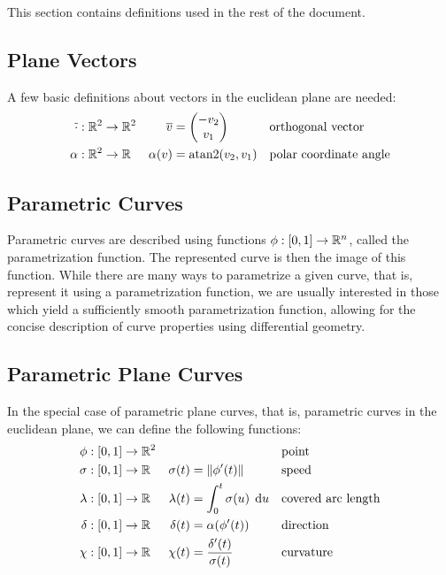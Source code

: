 \documentclass[a4paper]{article}
\begin{document}
		This section contains definitions used in the rest of the document.

		\subsection{Plane Vectors}
		\label{section:plane_vectors}

			A few basic definitions about vectors in the euclidean plane are needed:
			\begin{align*}
				\overline{\cdot} & : \function{\R{2}}{\R{2}} & \overline{v}      & = \vectorB{-v_2}{v_1}      && \text{orthogonal vector}\\
				\alpha           & : \function{\R{2}}{\RR}   & \apply{\alpha}{v} & = \apply{\atan2}{v_2, v_1} && \text{polar coordinate angle}
			\end{align*}

		\subsection{Parametric Curves}
		\label{section:parametric_curves}

			Parametric curves are described using functions \(\phi : \left[ 0,1 \right] \rightarrow \mathbb{R}^{n}\), called the parametrization function. The represented curve is then the image of this function. While there are many ways to parametrize a given curve, that is, represent it using a parametrization function, we are usually interested in those which yield a sufficiently smooth parametrization function, allowing for the concise description of curve properties using differential geometry.

		\subsection{Parametric Plane Curves}
		\label{section:parametric_plane_curves}

			In the special case of parametric plane curves, that is, parametric curves in the euclidean plane, we can define the following functions:
			\begin{align*}
				\phi    & : \function{\unit}{\R{2}} &                    &                                                && \text{point}\\
				\sigma  & : \function{\unit}{\RR}   & \apply{\sigma}{t}  & = \xn{\apply{\phi'}{t}}                        && \text{speed}\\
				\lambda & : \function{\unit}{\RR}   & \apply{\lambda}{t} & = \integral{0}{t}{\apply{\sigma}{u}}{u}        && \text{covered arc length}\\
				\delta  & : \function{\unit}{\RR}   & \apply{\delta}{t}  & = \apply{\alpha}{\apply{\phi'}{t}}             && \text{direction}\\
				\chi    & : \function{\unit}{\RR}   & \apply{\chi}{t}    & = \frac{\apply{\delta'}{t}}{\apply{\sigma}{t}} && \text{curvature}
			\end{align*}
\end{document}
